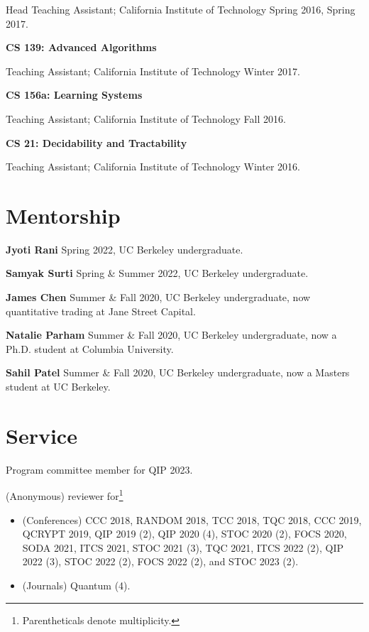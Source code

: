 \documentclass[11pt]{article}
\begin{document}
Head Teaching Assistant; California Institute of Technology Spring 2016, Spring 2017.

\textbf{CS 139: Advanced Algorithms}

Teaching Assistant; California Institute of Technology Winter 2017.

\textbf{CS 156a: Learning Systems}

Teaching Assistant; California Institute of Technology Fall 2016.

\textbf{CS 21: Decidability and Tractability}

Teaching Assistant; California Institute of Technology Winter 2016.




\section{Mentorship}
\textbf{Jyoti Rani}
Spring 2022, 
UC Berkeley undergraduate.

\textbf{Samyak Surti}
Spring \& Summer 2022,
UC Berkeley undergraduate.

\textbf{James Chen}
Summer \& Fall 2020,
UC Berkeley undergraduate, now quantitative trading at Jane Street Capital.

\textbf{Natalie Parham}
Summer \& Fall 2020,
UC Berkeley undergraduate, now a Ph.D. student at Columbia University.

\textbf{Sahil Patel} 
Summer \& Fall 2020,
UC Berkeley undergraduate, now a Masters student at UC Berkeley.

\section{Service}
Program committee member for QIP 2023.

(Anonymous) reviewer for\footnote{Parentheticals denote multiplicity.} 
\begin{itemize}
\item (Conferences) CCC 2018, RANDOM 2018, TCC 2018, TQC 2018, CCC 2019, QCRYPT 2019, QIP 2019 (2), QIP 2020 (4), STOC 2020 (2), FOCS 2020, SODA 2021, ITCS 2021, STOC 2021 (3), TQC 2021, ITCS 2022 (2), QIP 2022 (3), STOC 2022 (2), FOCS 2022 (2), and STOC 2023 (2).
\item (Journals) Quantum (4).
\end{itemize}
\end{document}
